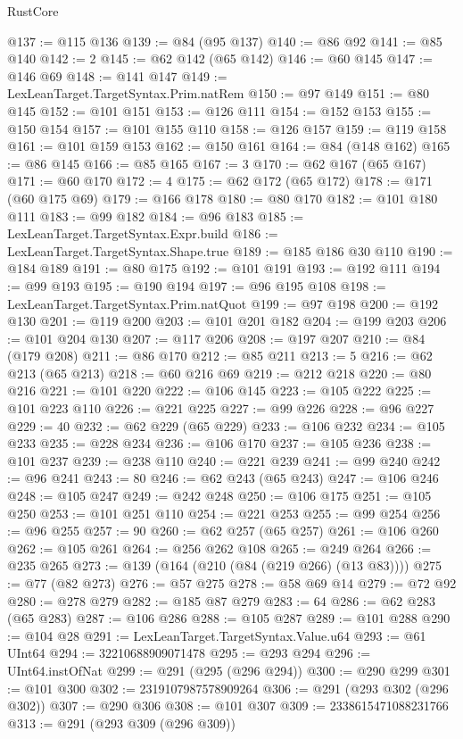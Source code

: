 \begin{lexlean}{RustCore}
\begin{coremodule}
@137 := @115 @136
@139 := @84 (@95 @137)
@140 := @86 @92
@141 := @85 @140
@142 := 2
@145 := @62 @142 (@65 @142)
@146 := @60 @145
@147 := @146 @69
@148 := @141 @147
@149 := LexLeanTarget.TargetSyntax.Prim.natRem
@150 := @97 @149
@151 := @80 @145
@152 := @101 @151
@153 := @126 @111
@154 := @152 @153
@155 := @150 @154
@157 := @101 @155 @110
@158 := @126 @157
@159 := @119 @158
@161 := @101 @159 @153
@162 := @150 @161
@164 := @84 (@148 @162)
@165 := @86 @145
@166 := @85 @165
@167 := 3
@170 := @62 @167 (@65 @167)
@171 := @60 @170
@172 := 4
@175 := @62 @172 (@65 @172)
@178 := @171 (@60 @175 @69)
@179 := @166 @178
@180 := @80 @170
@182 := @101 @180 @111
@183 := @99 @182
@184 := @96 @183
@185 := LexLeanTarget.TargetSyntax.Expr.build
@186 := LexLeanTarget.TargetSyntax.Shape.true
@189 := @185 @186 @30 @110
@190 := @184 @189
@191 := @80 @175
@192 := @101 @191
@193 := @192 @111
@194 := @99 @193
@195 := @190 @194
@197 := @96 @195 @108
@198 := LexLeanTarget.TargetSyntax.Prim.natQuot
@199 := @97 @198
@200 := @192 @130
@201 := @119 @200
@203 := @101 @201 @182
@204 := @199 @203
@206 := @101 @204 @130
@207 := @117 @206
@208 := @197 @207
@210 := @84 (@179 @208)
@211 := @86 @170
@212 := @85 @211
@213 := 5
@216 := @62 @213 (@65 @213)
@218 := @60 @216 @69
@219 := @212 @218
@220 := @80 @216
@221 := @101 @220
@222 := @106 @145
@223 := @105 @222
@225 := @101 @223 @110
@226 := @221 @225
@227 := @99 @226
@228 := @96 @227
@229 := 40
@232 := @62 @229 (@65 @229)
@233 := @106 @232
@234 := @105 @233
@235 := @228 @234
@236 := @106 @170
@237 := @105 @236
@238 := @101 @237
@239 := @238 @110
@240 := @221 @239
@241 := @99 @240
@242 := @96 @241
@243 := 80
@246 := @62 @243 (@65 @243)
@247 := @106 @246
@248 := @105 @247
@249 := @242 @248
@250 := @106 @175
@251 := @105 @250
@253 := @101 @251 @110
@254 := @221 @253
@255 := @99 @254
@256 := @96 @255
@257 := 90
@260 := @62 @257 (@65 @257)
@261 := @106 @260
@262 := @105 @261
@264 := @256 @262 @108
@265 := @249 @264
@266 := @235 @265
@273 := @139 (@164 (@210 (@84 (@219 @266) (@13 @83))))
@275 := @77 (@82 @273)
@276 := @57 @275
@278 := @58 @69 @14
@279 := @72 @92
@280 := @278 @279
@282 := @185 @87 @279
@283 := 64
@286 := @62 @283 (@65 @283)
@287 := @106 @286
@288 := @105 @287
@289 := @101 @288
@290 := @104 @28
@291 := LexLeanTarget.TargetSyntax.Value.u64
@293 := @61 UInt64
@294 := 32210688909071478
@295 := @293 @294
@296 := UInt64.instOfNat
@299 := @291 (@295 (@296 @294))
@300 := @290 @299
@301 := @101 @300
@302 := 2319107987578909264
@306 := @291 (@293 @302 (@296 @302))
@307 := @290 @306
@308 := @101 @307
@309 := 2338615471088231766
@313 := @291 (@293 @309 (@296 @309))

\end{coremodule}
\end{lexlean}
